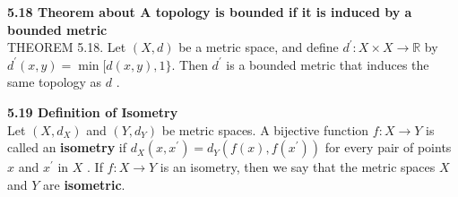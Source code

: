 \documentclass[12pt]{article}
\newenvironment{defn}[2][]{\par \medskip \noindent \textbf{#1 Definition of \large#2 \medskip \\}}{\rmfamily \medskip}
\newenvironment{thm}[2][]{\par \medskip \noindent \textbf{#1 Theorem about \large#2 \medskip \\}}{\rmfamily \medskip}
\begin{document}
		\begin{thm}[5.18]{A topology is bounded if it is induced by a bounded metric}
			THEOREM 5.18. Let $( X , d )$ be a metric space, and define $d ^ { \prime } : X \times X \rightarrow \mathbb { R }$
			by $d ^ { \prime } ( x , y ) = \min [ d ( x , y ) , 1 \} .$ Then $d ^ { \prime }$ is a bounded metric that induces the
			same topology as $d$ .
		\end{thm}
		\begin{defn}[5.19]{Isometry}
			Let $\left( X , d _ { X } \right)$ and $\left( Y , d _ { Y } \right)$ be metric spaces. A bijective function $f : X \rightarrow Y$ is called an \textbf{isometry} if $d _ { X } \left( x , x ^ { \prime } \right) = d _ { Y } \left( f ( x ) , f \left( x ^ { \prime } \right) \right)$ for
			every pair of points $x$ and $x ^ { \prime }$ in $X$ . If $f : X \rightarrow Y$ is an isometry, then we say
			that the metric spaces $X$ and $Y$ are \textbf{isometric}.
		\end{defn}
\end{document}
